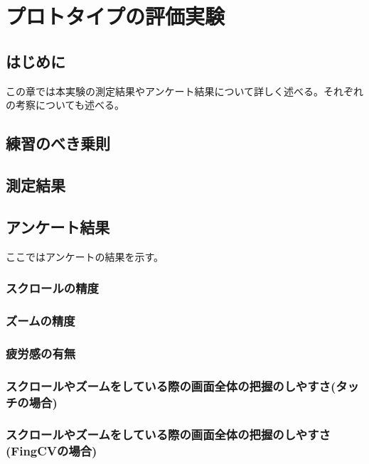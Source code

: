 \documentclass[11pt,a4j, titlepage]{jarticle} %
\begin{document}
\newpage
\section{プロトタイプの評価実験}
\subsection{はじめに}
この章では本実験の測定結果やアンケート結果について詳しく述べる。それぞれの考察についても述べる。


\subsection{練習のべき乗則}


\subsection{測定結果}


\subsection{アンケート結果}
ここではアンケートの結果を示す。

\subsubsection{スクロールの精度}


\subsubsection{ズームの精度}


\subsubsection{疲労感の有無}



\subsubsection{スクロールやズームをしている際の画面全体の把握のしやすさ(タッチの場合)}



\subsubsection{スクロールやズームをしている際の画面全体の把握のしやすさ(FingCVの場合)}
\end{document}

